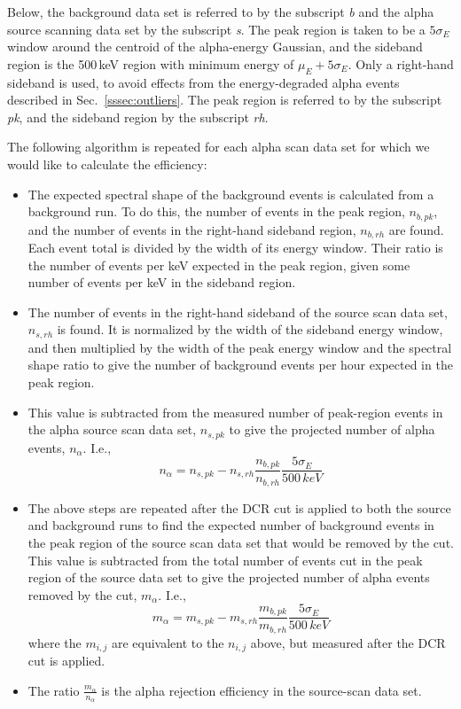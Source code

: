 Below, the background data set is referred to by the subscript {\it b} and the alpha source scanning data set by the subscript {\it s}. The peak region is taken to be a $5\sigma_E$ window around the centroid of the alpha-energy Gaussian, and the sideband region is the 500\,keV region with minimum energy of $\mu_E+5\sigma_E$. Only a right-hand sideband is used, to avoid effects from the energy-degraded alpha events described in Sec.~\ref{sssec:outliers}. The peak region is referred to by the subscript {\it pk}, and the sideband region by the subscript {\it rh}.

The following algorithm is repeated for each alpha scan data set for which we would like to calculate the efficiency:
\begin{itemize}
\item The expected spectral shape of the background events is calculated from a background run. To do this, the number of events in the peak region, $n_{b, pk}$, and the number of events in the right-hand sideband region, $n_{b, rh}$ are found. Each event total is divided by the width of its energy window. Their ratio is the number of events per keV expected in the peak region, given some number of events per keV in the sideband region.
\item The number of events in the right-hand sideband of the source scan data set, $n_{s, rh}$ is found. It is normalized by the width of the sideband energy window, and then multiplied by the width of the peak energy window and the spectral shape ratio to give the number of background events per hour expected in the peak region. 
\item This value is subtracted from the measured number of peak-region events in the alpha source scan data set, $n_{s, pk}$ to give the projected number of alpha events, $n_{\alpha}$. I.e., 
$$ n_{\alpha} =  n_{s, pk}-n_{s, rh}\frac{n_{b, pk}}{n_{b, rh}}\frac{5\sigma_E}{500\,keV} $$
\item The above steps are repeated after the DCR cut is applied to both the source and background runs to find the expected number of background events in the peak region of the source scan data set that would be removed by the cut. This value is subtracted from the total number of events cut in the peak region of the source data set to give the projected number of alpha events removed by the cut, $m_\alpha$. I.e.,
 $$ m_{\alpha} =  m_{s, pk}-m_{s, rh}\frac{m_{b, pk}}{m_{b, rh}}\frac{5\sigma_E}{500\,keV} $$
 where the $m_{i, j}$ are equivalent to the $n_{i, j}$ above, but measured after the DCR cut is applied. 
\item The ratio $\frac{m_\alpha}{n_\alpha}$ is the alpha rejection efficiency in the source-scan data set. 
\end{itemize}

